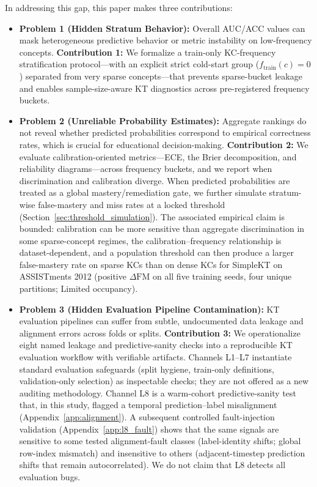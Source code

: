 In addressing this gap, this paper makes three contributions:
\begin{itemize}
    \item \textbf{Problem 1 (Hidden Stratum Behavior):} Overall AUC/ACC values can mask heterogeneous predictive behavior or metric instability on low-frequency concepts.
    \textbf{Contribution 1:} We formalize a train-only KC-frequency stratification protocol---with an explicit strict cold-start group ($f_{\mathrm{train}}(c) = 0$) separated from very sparse concepts---that prevents sparse-bucket leakage and enables sample-size-aware KT diagnostics across pre-registered frequency buckets.
    \item \textbf{Problem 2 (Unreliable Probability Estimates):} Aggregate rankings do not reveal whether predicted probabilities correspond to empirical correctness rates, which is crucial for educational decision-making.
    \textbf{Contribution 2:} We evaluate calibration-oriented metrics---ECE, the Brier decomposition, and reliability diagrams---across frequency buckets, and we report when discrimination and calibration diverge. When predicted probabilities are treated as a global mastery/remediation gate, we further simulate stratum-wise false-mastery and miss rates at a locked threshold (Section~\ref{sec:threshold_simulation}). The associated empirical claim is bounded: calibration can be more sensitive than aggregate discrimination in some sparse-concept regimes, the calibration--frequency relationship is dataset-dependent, and a population threshold can then produce a larger false-mastery rate on sparse KCs than on dense KCs for SimpleKT on ASSISTments 2012 (positive $\Delta\mathrm{FM}$ on all five training seeds, four unique partitions; Limited occupancy).
    \item \textbf{Problem 3 (Hidden Evaluation Pipeline Contamination):} KT evaluation pipelines can suffer from subtle, undocumented data leakage and alignment errors across folds or splits.
    \textbf{Contribution 3:} We operationalize eight named leakage and predictive-sanity checks into a reproducible KT evaluation workflow with verifiable artifacts. Channels L1--L7 instantiate standard evaluation safeguards (split hygiene, train-only definitions, validation-only selection) as inspectable checks; they are not offered as a new auditing methodology. Channel L8 is a warm-cohort predictive-sanity test that, in this study, flagged a temporal prediction--label misalignment (Appendix~\ref{app:alignment}). A subsequent controlled fault-injection validation (Appendix~\ref{app:l8_fault}) shows that the same signals are sensitive to some tested alignment-fault classes (label-identity shifts; global row-index mismatch) and insensitive to others (adjacent-timestep prediction shifts that remain autocorrelated). We do not claim that L8 detects all evaluation bugs.
\end{itemize}

